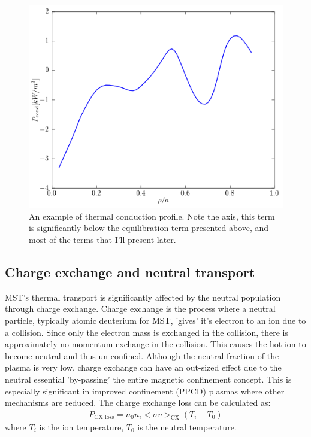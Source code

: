 \begin{refsection}
\begin{figure}[!htb]
	\centering
	\includegraphics[width = 0.75\linewidth]{./transport_modeling/p_cond.png}
    \caption[Thermal conduction profile]{An example of thermal conduction profile. Note the axis, this term is significantly below the equilibration term presented above, and most of the terms that I'll present later.}
    \label{fig:p_cond}
\end{figure}%

\subsection{Charge exchange and neutral transport}\label{sec:neutral_physics}

MST's thermal transport is significantly affected by the neutral population through charge exchange. Charge exchange is the process where a neutral particle, typically atomic deuterium for MST, 'gives' it's electron to an ion due to a collision. Since only the electron mass is exchanged in the collision, there is approximately no momentum exchange in the collision.
This causes the hot ion to become neutral and thus un-confined. Although the neutral fraction of the plasma is very low, charge exchange can have an out-sized effect due to the neutral essential 'by-passing' the entire magnetic confinement concept. 
This is especially significant in improved confinement (PPCD) plasmas where other mechanisms are reduced. The charge exchange loss can be calculated as:
\begin{align}
    P_{\text{CX loss}} = n_0 n_i <\sigma v>_\text{CX} (T_i - T_0)
\end{align}
where $T_i$ is the ion temperature, $T_{0}$ is the neutral temperature.


\end{refsection}
